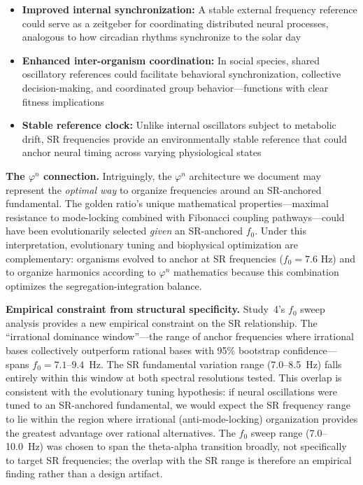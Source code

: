 \documentclass[11pt,a4paper]{article}
\newcommand{\phisym}{\varphi}
\begin{document}
\begin{itemize}
    \item \textbf{Improved internal synchronization:} A stable external frequency reference could serve as a zeitgeber for coordinating distributed neural processes, analogous to how circadian rhythms synchronize to the solar day
    \item \textbf{Enhanced inter-organism coordination:} In social species, shared oscillatory references could facilitate behavioral synchronization, collective decision-making, and coordinated group behavior---functions with clear fitness implications
    \item \textbf{Stable reference clock:} Unlike internal oscillators subject to metabolic drift, SR frequencies provide an environmentally stable reference that could anchor neural timing across varying physiological states
\end{itemize}

\textbf{The $\phisym^n$ connection.} Intriguingly, the $\phisym^n$ architecture we document may represent the \textit{optimal way} to organize frequencies around an SR-anchored fundamental. The golden ratio's unique mathematical properties---maximal resistance to mode-locking combined with Fibonacci coupling pathways---could have been evolutionarily selected \textit{given} an SR-anchored $f_0$. Under this interpretation, evolutionary tuning and biophysical optimization are complementary: organisms evolved to anchor at SR frequencies ($f_0 = 7.6$ Hz) and to organize harmonics according to $\phisym^n$ mathematics because this combination optimizes the segregation-integration balance.

\textbf{Empirical constraint from structural specificity.} Study~4's $f_0$ sweep analysis provides a new empirical constraint on the SR relationship. The ``irrational dominance window''---the range of anchor frequencies where irrational bases collectively outperform rational bases with 95\% bootstrap confidence---spans $f_0 = 7.1$--$9.4$~Hz. The SR fundamental variation range (7.0--8.5~Hz) falls entirely within this window at both spectral resolutions tested. This overlap is consistent with the evolutionary tuning hypothesis: if neural oscillations were tuned to an SR-anchored fundamental, we would expect the SR frequency range to lie within the region where irrational (anti-mode-locking) organization provides the greatest advantage over rational alternatives. The $f_0$ sweep range (7.0--10.0~Hz) was chosen to span the theta-alpha transition broadly, not specifically to target SR frequencies; the overlap with the SR range is therefore an empirical finding rather than a design artifact.
\end{document}
